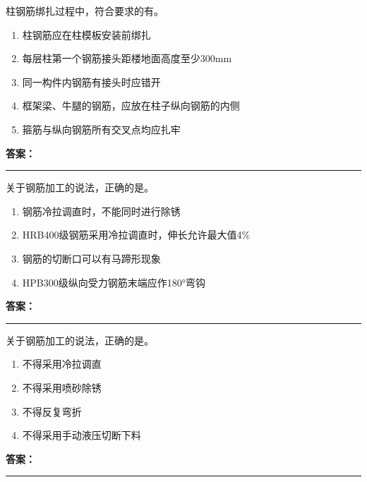 \documentclass[UTF8,fontset=fandol,11pt]{ctexart}
\newcommand{\answerline}{\textcolor{answerred}{\rule{2.4cm}{0.7pt}}}
\begin{document}
\begin{quizbox}[title={第 29 题}]
柱钢筋绑扎过程中，符合要求的有。\\
\begin{enumerate}[label=\Alph*.]
\item 柱钢筋应在柱模板安装前绑扎
\item 每层柱第一个钢筋接头距楼地面高度至少300mm
\item 同一构件内钢筋有接头时应错开
\item 框架梁、牛腿的钢筋，应放在柱子纵向钢筋的内侧
\item 箍筋与纵向钢筋所有交叉点均应扎牢
\end{enumerate}
\textbf{\textcolor{answerred}{答案：}} \answerline
\end{quizbox}

\vspace{0.2em}

\begin{quizbox}[title={第 30 题}]
关于钢筋加工的说法，正确的是。\\
\begin{enumerate}[label=\Alph*.]
\item 钢筋冷拉调直时，不能同时进行除锈
\item HRB400级钢筋采用冷拉调直时，伸长允许最大值4\%
\item 钢筋的切断口可以有马蹄形现象
\item HPB300级纵向受力钢筋末端应作180°弯钩
\end{enumerate}
\textbf{\textcolor{answerred}{答案：}} \answerline
\end{quizbox}

\vspace{0.2em}

\begin{quizbox}[title={第 31 题}]
关于钢筋加工的说法，正确的是。\\
\begin{enumerate}[label=\Alph*.]
\item 不得采用冷拉调直
\item 不得采用喷砂除锈
\item 不得反复弯折
\item 不得采用手动液压切断下料
\end{enumerate}
\textbf{\textcolor{answerred}{答案：}} \answerline
\end{quizbox}

\vspace{0.2em}
\end{document}
